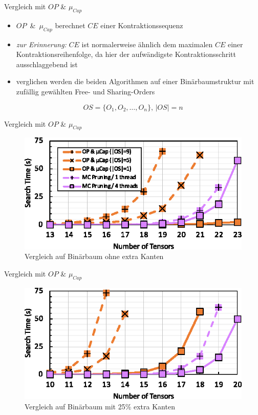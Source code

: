 \documentclass{beamer}
\begin{document}
\begin{frame}{Vergleich mit $OP$ \& $\mu_{Cap}$}
	\begin{itemize}
		\item \mbox{$OP$ \& $\mu_{Cap}$} berechnet $CE$ einer Kontraktionssequenz
		\item \textit{zur Erinnerung:} $CE $ ist normalerweise ähnlich dem maximalen $CE$ einer Kontraktionsreihenfolge, da hier der aufwändigste Kontraktionsschritt ausschlaggebend ist \pause
		\item verglichen werden die beiden Algorithmen auf einer Binärbaumstruktur mit zufällig gewählten Free- und Sharing-Orders
	\end{itemize}
	\begin{equation*}
		OS = \{O_1, O_2, \ldots, O_n\} \text{, } |OS| = n
	\end{equation*}
\end{frame}

\begin{frame}{Vergleich mit $OP$ \& $\mu_{Cap}$}
	\begin{figure}
		\includegraphics[scale=1.3]{figure_14_a}
		\caption*{Vergleich auf Binärbaum ohne extra Kanten}
	\end{figure}
\end{frame}

\begin{frame}{Vergleich mit $OP$ \& $\mu_{Cap}$}
	\begin{figure}
		\includegraphics[scale=1.3]{figure_14_b}
		\caption*{Vergleich auf Binärbaum mit 25\% extra Kanten}
	\end{figure}
\end{frame}
\end{document}
